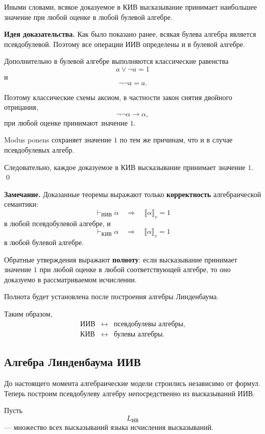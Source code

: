 \documentclass[12pt,a4paper,oneside,openany]{book}
\theoremstyle{definition}
\theoremstyle{plain}
\theoremstyle{remark}
\begin{document}
Иными словами, всякое доказуемое в КИВ высказывание принимает
наибольшее значение при любой оценке в любой булевой алгебре.

\textbf{Идея доказательства.}
Как было показано ранее, всякая булева алгебра является
псевдобулевой. Поэтому все операции ИИВ определены и в булевой
алгебре.

Дополнительно в булевой алгебре выполняются классические равенства
\[
a\vee\neg a=1
\]
и
\[
\neg\neg a=a.
\]

Поэтому классические схемы аксиом, в частности закон снятия двойного
отрицания,
\[
\neg\neg\alpha\to\alpha,
\]
при любой оценке принимают значение \(1\).

Modus ponens сохраняет значение \(1\) по тем же причинам, что и в
случае псевдобулевых алгебр.

Следовательно, каждое доказуемое в КИВ высказывание принимает
значение \(1\).
\qed

\textbf{Замечание.}
Доказанные теоремы выражают только \textbf{корректность}
алгебраической семантики:
\[
\vdash_{\mathrm{ИИВ}}\alpha
\quad\Longrightarrow\quad
\llbracket\alpha\rrbracket_v=1
\]
в любой псевдобулевой алгебре, и
\[
\vdash_{\mathrm{КИВ}}\alpha
\quad\Longrightarrow\quad
\llbracket\alpha\rrbracket_v=1
\]
в любой булевой алгебре.

Обратные утверждения выражают \textbf{полноту}:
если высказывание принимает значение \(1\) при любой оценке в любой
соответствующей алгебре, то оно доказуемо в рассматриваемом
исчислении.

Полнота будет установлена после построения алгебры Линденбаума.

Таким образом,
\[
\boxed{
\begin{array}{ccc}
\text{ИИВ}
&
\longleftrightarrow
&
\text{псевдобулевы алгебры},
\\[2mm]
\text{КИВ}
&
\longleftrightarrow
&
\text{булевы алгебры}.
\end{array}
}
\]

\subsection{Алгебра Линденбаума ИИВ}

До настоящего момента алгебраические модели строились независимо от
формул. Теперь построим псевдобулеву алгебру непосредственно из
высказываний ИИВ.

Пусть
\[
L_{\mathrm{ИВ}}
\]
--- множество всех высказываний языка исчисления высказываний.
\end{document}
